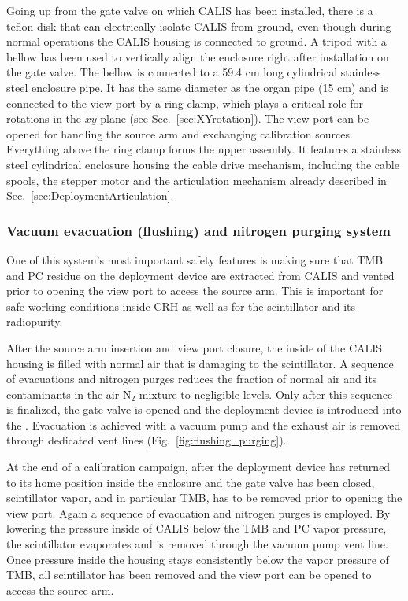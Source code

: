 Going up from the gate valve on which CALIS has been installed, there is a teflon disk that can electrically isolate CALIS from ground, even though during normal operations the CALIS housing is connected to ground. A tripod with a bellow has been used to vertically align the enclosure right after installation on the gate valve. The bellow is connected to a 59.4 cm long cylindrical stainless steel enclosure pipe. It has the same diameter as the organ pipe (15 cm) and is connected to the view port by a ring clamp, which plays a critical role for rotations in the $xy$-plane (see Sec.~\ref{sec:XYrotation}). The view port can be opened for handling the source arm and exchanging calibration sources. Everything above the ring clamp forms the upper assembly. It features a stainless steel cylindrical enclosure housing the cable drive mechanism, including the cable spools, the stepper motor and the articulation mechanism already described in Sec.~\ref{sec:DeploymentArticulation}. 

\subsubsection*{Vacuum evacuation (flushing) and nitrogen purging system}\label{sec:EvacPurge}
One of this system's most important safety features is making sure that TMB and PC residue on the deployment device are extracted from CALIS and vented prior to opening the view port to access the source arm. This is important for safe working conditions inside CRH as well as for the scintillator and its radiopurity. 

After the source arm insertion and view port closure, the inside of the CALIS housing is filled with normal air that is damaging to the scintillator. A sequence of evacuations and nitrogen purges reduces the fraction of normal air and its contaminants in the air-N$_2$ mixture to negligible levels. Only after this sequence is finalized, the gate valve is opened and the deployment device is introduced into the \lsv. Evacuation is achieved with a vacuum pump and the exhaust air is removed through dedicated vent lines (Fig.~\ref{fig:flushing_purging}).

At the end of a calibration campaign, after the deployment device has returned to its home position inside the enclosure and the gate valve has been closed, scintillator vapor, and in particular TMB, has to be removed prior to opening the view port. Again a sequence of evacuation and nitrogen purges is employed. By lowering the pressure inside of CALIS below the TMB and PC vapor pressure, the scintillator evaporates and is removed through the vacuum pump vent line. Once pressure inside the housing stays consistently below the vapor pressure of TMB, all scintillator has been removed and the view port can be opened to access the source arm.
 
